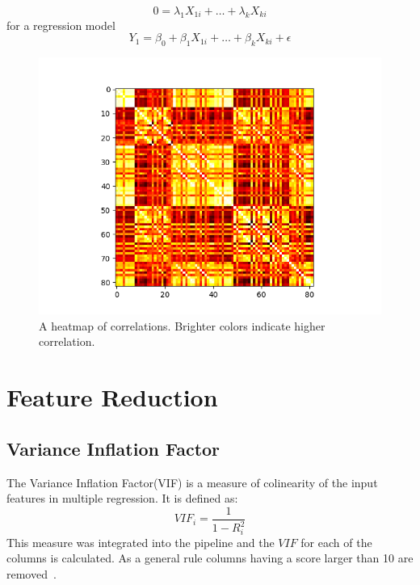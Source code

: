 \documentclass{article}
\begin{document}
\begin{equation}
    0 = \lambda_1X_{1i} +\dots +\lambda_kX_{ki}
\end{equation}{} for a regression model
\begin{equation}
    Y_1 = \beta_0+\beta_1X_{1i} + \dots + \beta_kX_{ki} + \epsilon
\end{equation}{}
\begin{figure}[H]
\label{fig:heat}
  \centering
    \includegraphics[scale=0.7]{images/heatmap.png}
    \caption{A heatmap of correlations. Brighter colors indicate higher correlation.}
\end{figure}


\section{Feature Reduction}
\subsection{Variance Inflation Factor} 
The Variance Inflation Factor(VIF) is a measure of colinearity of the input features in multiple regression. It is defined as:
\begin{equation}
    VIF_i = \frac{1}{1-R_i^2}
\end{equation}{}
This measure was integrated into the pipeline and the \(VIF\) for each of the columns is calculated. As a general rule columns having a score larger than 10 are removed~\autocite{kutner2005applied}.
\end{document}
